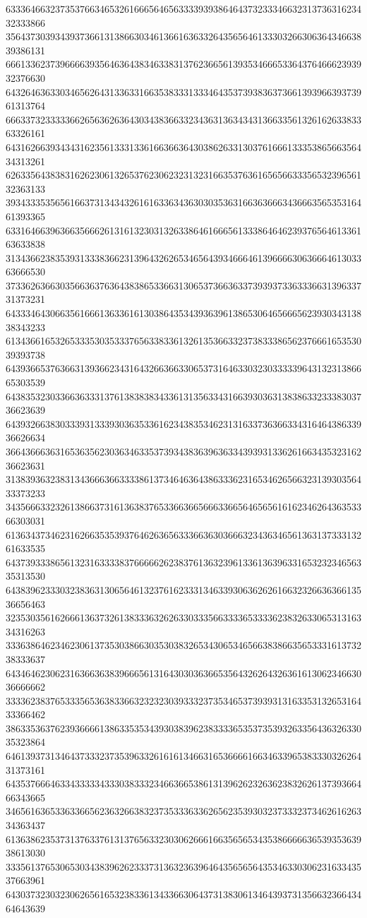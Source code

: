 63336466323735376634653261666564656333393938646437323334663231373631623432333866
35643730393439373661313866303461366163633264356564613330326630636434663839386131
66613362373966663935646364383463383137623665613935346665336437646662393932376630
64326463633034656264313363316635383331333464353739383637366139396639373961313764
66633732333336626563626364303438366332343631363434313663356132616263383363326161
64316266393434316235613331336166366364303862633130376166613335386566356434313261
62633564383831626230613265376230623231323166353763616565663335653239656132363133
39343335356561663731343432616163363436303035363166363666343666356535316461393365
63316466396366356662613161323031326338646166656133386464623937656461336163633838
31343662383539313338366231396432626534656439346664613966663063666461303363666530
37336263663035663637636438386533663130653736636337393937336333663139633731373231
64333464306635616661363361613038643534393639613865306465666562393034313838343233
61343661653265333530353337656338336132613536633237383338656237666165353039393738
64393665376366313936623431643266366330653731646330323033333964313231386665303539
64383532303366363331376138383834336131356334316639303631383863323338303736623639
64393266383033393133393036353361623438353462313163373636633431646438633936626634
36643666363165363562303634633537393438363963633439393133626166343532316236623631
31383936323831343666366333386137346463643863336231653462656632313930356433373233
34356663323261386637316136383765336636656663366564656561616234626436353366303031
61363437346231626635353937646263656333663630366632343634656136313733313261633535
64373933386561323163333837666662623837613632396133613639633165323234656335313530
64383962333032383631306564613237616233313463393063626261663232663636613536656463
32353035616266613637326138333632626330333566333365333362383263306531316334316263
33363864623462306137353038663035303832653430653465663838663565333161373238333637
64346462306231636636383966656131643030363665356432626432636161306234663036666662
33336238376533356536383366323232303933323735346537393931316335313265316433366462
38633536376239366661386335353439303839623833336535373539326335643632633035323864
64613937313464373332373539633261616134663165366661663463396538333032626431373161
64353766646334333334333038333234663665386131396262326362383262613739366466343665
34656163653363366562363266383237353336336265623539303237333237346261626334363437
61363862353731376337613137656332303062666166356565343538666663653935363938613030
33356137653065303438396262333731363236396464356565643534633030623163343537663961
64303732303230626561653238336134336630643731383061346439373135663236643464643639
